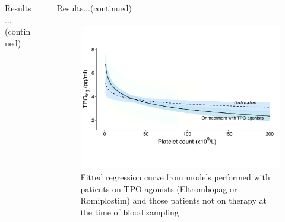 \documentclass[landscape,a0paper,fontscale=0.285]{beamer} %
\newlength{\sepwid}
\newlength{\onecolwid}
\newlength{\twocolwid}
\begin{document}
\begin{frame}[t]
\begin{columns}[t]
\begin{column}{\twocolwid}
\begin{columns}[t,totalwidth=\twocolwid]
\begin{column}{\onecolwid}
\begin{block}{Results...(continued)}
\end{block}


\end{column} %

\end{columns} %

\end{column} %

\begin{column}{\sepwid}\end{column} %

\begin{column}{\onecolwid} %


\begin{block}{Results...(continued)}
\paragraph{} 
\begin{figure}
\includegraphics[width=0.8\linewidth]{fig/treatment1.pdf}
\caption{Fitted regression curve from models performed with patients on TPO agonists (Eltrombopag or Romiplostim) and those patients not on therapy at the time of blood sampling}
\end{figure}



\end{block}
\end{column}
\end{columns}
\end{frame}
\end{document}
